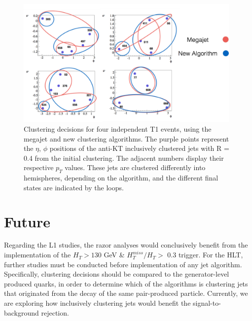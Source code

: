 \documentclass[twocolumn,aps,prd,reprint]{revtex4-1}
\begin{document}
\begin{center}
\begin{figure}
\centering
\includegraphics[width=0.98\textwidth]{eta_phi.pdf}
\caption{\label{fig:eta_phi} Clustering decisions for four independent T1 events, using the megajet and new clustering algorithms. The purple points represent the $\eta$, $\phi$ positions of the anti-KT inclusively clustered jets with R = 0.4 from the initial clustering. The adjacent numbers display their respective $p_T$ values. These jets are clustered differently into hemispheres, depending on the algorithm, and the different final states are indicated by the loops. }
\end{figure}
\end{center}
\twocolumngrid
\section{Future}
Regarding the L1 studies, the razor analyses would conclusively benefit from the implementation of the $H_T>130$ GeV \& $H_T^{miss}/H_T >$ 0.3 trigger. For the HLT, further studies must be conducted before implementation of any jet algorithm. Specifically, clustering decisions should be compared to the generator-level produced quarks, in order to determine which of the algorithms is clustering jets that originated from the decay of the same pair-produced particle. Currently, we are exploring how inclusively clustering jets would benefit the signal-to-background rejection. 
\end{document}
